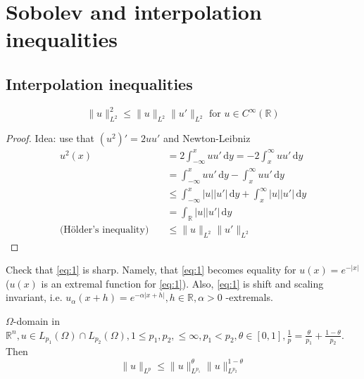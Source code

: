 \documentclass{report}
\begin{document}
\setcounter{chapter}{4}

\chapter{Sobolev and interpolation inequalities}
\section{Interpolation inequalities}

\ex{}
{
    \begin{equation} \label{eq:1}
        \|u\|_{L^{2}}^{2} \leq \|u\|_{L^{2}} \|u'\|_{L^{2}} \text{ for } u \in C^{\infty}(\mathbb{R}) 
    \end{equation}
}

\begin{proof}
    Idea: use that \((u^2)' = 2uu'\) and Newton-Leibniz
    \begin{align*}
        u^2(x) &= 2 \int_{-\infty}^{x} u u' \,\mathrm{d}y = -2 \int_{x}^{\infty} u u' \,\mathrm{d}y \\
        &= \int_{-\infty}^{x} u u' \,\mathrm{d}y - \int_{x}^{\infty} u u' \,\mathrm{d}y \\
        & \leq \int_{-\infty}^{x} \vert u \vert  \vert u' \vert  \,\mathrm{d}y + \int_{x}^{\infty} \vert u \vert  \vert u' \vert \,\mathrm{d}y \\
        &= \int_{\mathbb{R}} \vert u \vert  \vert u' \vert \,\mathrm{d}y \\
        \text{(Hölder's inequality)} \quad & \leq \|u\|_{L^{2}} \|u'\|_{L^{2}}
    \end{align*}
\end{proof}

\qs{}
{
    Check that \ref{eq:1} is sharp. Namely, that \ref{eq:1} becomes equality for \(u(x) = e^{-\vert x \vert}\) (\(u(x)\) is an extremal function for \ref{eq:1}). Also, \ref{eq:1} is shift and scaling invariant, i.e. \(u_{\alpha}(x+h) = e^{-\alpha|x+h|}, h \in \mathbb{R}, \alpha>0\) -extremals.
}

{
    \(\Omega\)-domain in \(\mathbb{R}^{n}, u \in L_{p_1}(\Omega) \cap L_{p_2}(\Omega), 1 \leq p_1, p_2, \leq \infty, p_1 < p_2, \theta \in [0, 1], \frac{1}{p} = \frac{\theta}{p_1} + \frac{1-\theta}{p_2}\). Then
    \begin{equation}\label{eq:2}
        \|u\|_{L^{p}} \leq \|u\|_{L^{p_1}}^{\theta} \|u\|_{L^{p_2}}^{1 - \theta}
    \end{equation} 
}
\end{document}
